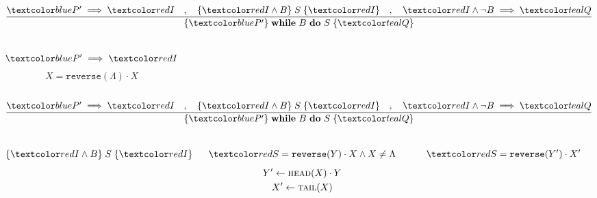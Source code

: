 
\begin{frame}
  \begin{center}
    
  \end{center}
\end{frame}

\begin{frame}
  \[
    \dfrac{\blue{P'} \implies \red{I} \quad,\quad \{\red{I} \land B\}\; S\; \{\red{I}\}
    \quad,\quad \red{I} \land \lnot B \implies \teal{Q}}
    {\{\blue{P'}\}\; \textbf{while}\ B\ \textbf{do}\ S\; \{\teal{Q}\}}
  \]
  
  \begin{columns}
      
      \pause
      \[
        \blue{P'} \implies \red{I}
      \]
      \pause
      \[
        X = \texttt{reverse}(\Lambda) \cdot X
      \]
  \end{columns}
\end{frame}

\begin{frame}
  \[
    \dfrac{\blue{P'} \implies \red{I} \quad,\quad \{\red{I} \land B\}\; S\; \{\red{I}\}
    \quad,\quad \red{I} \land \lnot B \implies \teal{Q}}
    {\{\blue{P'}\}\; \textbf{while}\ B\ \textbf{do}\ S\; \{\teal{Q}\}}
  \]
  
  \begin{columns}
      
      \pause
        \[
          \{\red{I} \land B\}\; S\; \{\red{I}\}
        \]
        
      \pause
      \vspace{-0.30cm}
      \begin{gather}
        \red{S = \texttt{reverse}(Y) \cdot X} \land X \neq \Lambda \\[5pt]
        Y' \gets \Call{head}{X} \cdot Y \\
        X' \gets \Call{tail}{X}
      \end{gather}
      \hrule
      \begin{gather}
        \red{S = \texttt{reverse}(Y') \cdot X'}
      \end{gather}
  \end{columns}
\end{frame}

